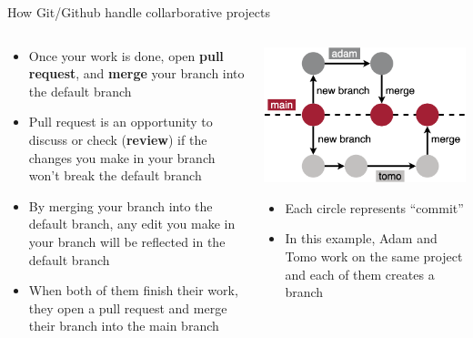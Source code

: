 \documentclass[handout,pdftex,10pt,aspectratio=169]{beamer}
\begin{document}
\begin{frame}{How Git/Github handle collarborative projects}
  \begin{columns}[c]
    \begin{column}{0.55\linewidth}
      \begin{itemize}[<+->] \setlength\itemsep{10pt}
        \item Once your work is done, open \textbf{pull request}, and \textbf{merge} your branch
        into the default branch
        \item Pull request is an opportunity to discuss or check (\textbf{review})
        if the changes you make in your branch won't break the default branch
        \item By merging your branch into the default branch, any edit you make in your branch
        will be reflected in the default branch
        \item When both of them finish their work, they open a pull request and 
        merge their branch into the main branch
      \end{itemize}
    \end{column} \hfill
    \begin{column}{0.44\linewidth}
      \includegraphics[width = \linewidth]{github_branch.png}
      \begin{itemize}
        \item Each circle represents ``commit''
        \item In this example, Adam and Tomo work on the same project and 
        each of them creates a branch
      \end{itemize}
    \end{column}
  \end{columns}
\end{frame}
\end{document}
